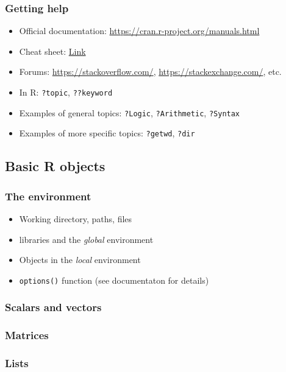 \documentclass{beamer}
\begin{document}
\begin{frame}
    \frametitle{Getting help}
    \begin{itemize}
	  \item Official documentation: \url{https://cran.r-project.org/manuals.html}
	  \item Cheat sheet: \href{https://cran.r-project.org/doc/contrib/Short-refcard.pdf}{Link}
	  \item Forums: \url{https://stackoverflow.com/}, \url{https://stackexchange.com/}, etc.
	  \item In R: \texttt{?topic}, \texttt{??keyword}
	  \item Examples of general topics: \texttt{?Logic}, \texttt{?Arithmetic}, \texttt{?Syntax}
	  \item Examples of more specific topics: \texttt{?getwd}, \texttt{?dir}
    \end{itemize}
\end{frame}


\subsection{Basic R objects}

\begin{frame}[fragile]
    \frametitle{The environment}
    \begin{itemize}
      \item Working directory, paths, files
      \item libraries and the \emph{global} environment
      \item Objects in the \emph{local} environment
      \item \texttt{options()} function (see documentaton for details)
    \end{itemize}
    
\end{frame}


\begin{frame}[fragile]
    \frametitle{Scalars and vectors}
    
\end{frame}


\begin{frame}[fragile]
    \frametitle{Matrices}
    
\end{frame}


\begin{frame}[fragile]
    \frametitle{Lists}
    \fontsize{11pt}{10}\selectfont
    
\end{frame}
\end{document}
